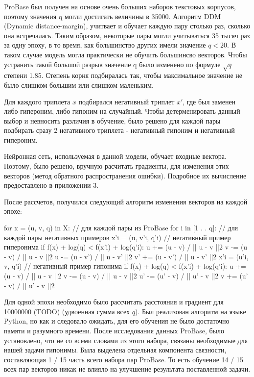 ProBase был получен на основе очень больших наборов текстовых корпусов, поэтому
значения q могли достигать величины в 35000. Алгоритм DDM (Dynamic distance-margin),
учитвает и обучает каждую пару столько раз, сколько она встречалась. Таким образом,
некоторые пары могли учитываться 35 тысяч раз за одну эпоху, в то время, как
большинство других имели значение $q < 20$. В таком случае модель могла практически не
обучить большинсво векторов. Чтобы устранить такой большой разрыв значение q было
изменено по формуле $\sqrt{q}$ степени 1.85. Степень корня подбиралась так, чтобы
максимальное значение не было слишком большим или слишком маленьким.

Для каждого триплета $x$ подбирался негативный триплет $x'$, где был заменен либо
гипероним, либо гипоним на случайный. Чтобы детерменировать данный выбор и
невносить различия в обучение, было решено для каждой пары подбирать сразу 2
негативного триплета - негативный гипоним и негативный гипероним.

Нейронная сеть, используемая в данной модели, обучает входные вектора. Поэтому, было
решено, вручную расчитать градиенты, для изменения этих векторов (метод обратного
распространения ошибки). Подробное их вычисление предоставлено в приложении 3.

После рассчетов, получился следующий алгоритм изменения векторов на каждой эпохе:

for x = (u, v, q) in X: // для каждой пары из ProBase
for i in [1 . . q]: // для каждой пары негативных примеров
x’i = (u, v’i, q’i) // негативный пример гиперонима
if f(x) + log(q) < f(x’i) + log(q’i):
u += (u - v) / || u - v ||2
v -= (u - v) / || u - v ||2
u -= (u - v’) / || u - v’ ||2
v’ += (u - v’) / || u - v’ ||2
x’i = (u’i, v, q’i) // негативный пример гипонима
if f(x) + log(q) < f(x’i) + log(q’i):
u += (u - v) / || u - v ||2
v -= (u - v) / || u - v ||2
u’ -= (u’ - v) / || u’ - v ||2
v += (u’ - v) / || u’ - v ||2

Для одной эпохи необходимо было рассчитать расстояния и градиент для 10000000
(TODO) (удвоенная сумма всех $q$).
Был реализован алгоритм на языке Python, но как и следовало ожидать, для его обучения
не было достаточно памяти и разумного времени.
После исследования данных ProBase, было установлено, что не со всеми словами из этого
набора, связаны необходимые для нашей задачи гипонимы. Была выделена отдельная
компонента связности, составляющая 1 / 15 часть всего набора пар ProBase. То есть
обучение 14 / 15 всех пар векторов никак не влияло на улучшение результата
поставленной задачи.

